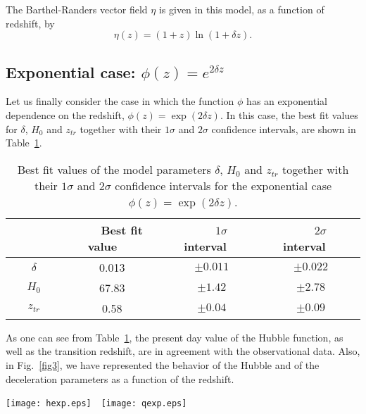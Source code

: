 \documentclass[aps,superscriptaddress, showpacs,preprintnumbers, superscriptaddress, nofootinbibt,twocolumn]{revtex4-2}
\def\be{\begin{equation}}
\def\ee{\end{equation}}
\begin{document}
The Barthel-Randers vector field $\eta$ is given in this model, as a function of redshift, by
\be
\eta (z)=(1+z)\ln (1+\delta z).
\ee

\subsection{Exponential case: $\phi (z)=e^{2\delta z}$}

Let us finally consider the case in which the function $\phi$ has an exponential dependence on the redshift,  $\phi (z)=\exp(2\delta z)$. In this case, the best fit values for $\delta$, $H_0$ and $z_{tr}$ together with their $1\sigma$ and $2\sigma$ confidence intervals, are shown in Table~\ref{tab3}.

\begin{table}[h!]
	\begin{center}
		\begin{tabular}{|c||c|c|c|}
			\hline
			~~~~~~~&~~~Best fit value~~~&~~~$1\sigma$~interval~~~&~~~$2\sigma$~interval~~~\\
			\hline%
			$\delta $&0.013&$\pm0.011$&$\pm0.022$\\
			\hline
			$H_0$&67.83&$\pm1.42$&$\pm2.78$\\
			\hline	$z_{tr}$&0.58&$\pm0.04$&$\pm0.09$\\
			\hline
		\end{tabular}
	\end{center}
	\caption{Best fit values of the model parameters $\delta$, $H_0$ and $z_{tr} $ together with their $1\sigma$ and $2\sigma$ confidence intervals for the exponential case $\phi (z)=\exp(2\delta z)$.\label{tab3}}
\end{table}

As one can see from Table~\ref{tab3}, the present day value of the Hubble function, as well as the transition redshift, are in agreement with the observational data. Also, in Fig.~\ref{fig3}, we have represented the behavior of the Hubble and of the deceleration parameters as a function of the redshift.

\begin{figure*}
	\texttt{[image: hexp.eps]}~~\texttt{[image: qexp.eps]}
	\caption{\label{fig3}The evolution of the Hubble parameter (left panel) and of the deceleration parameter (right panel) as a function of the redshift in the exponential case $\phi (z)=\exp(2\delta z)$. The dashed, dotted and dot-dashed curves correspond to the best fit and lower/higher $2\sigma$ extreme values of the parameter $\delta$ in Table~\ref{tab2}. The red solid line corresponds to the $\Lambda$CDM model, and the error bars represent the observational data.}
\end{figure*}
\end{document}
